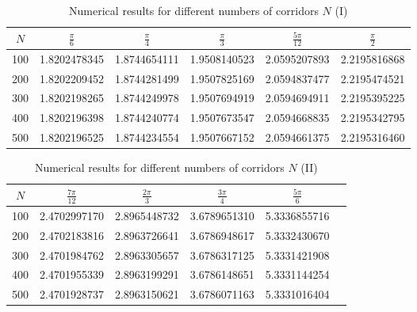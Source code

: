 \documentclass[12pt,a4paper]{article}
\theoremstyle{remark} %
\begin{document}
\begin{table}[htbp]
\centering
\small
\caption{Numerical results for different numbers of corridors $N$ (I)}
\begin{tabular}{c ccccc}
\toprule
$N$ 
& $\frac{\pi}{6}$ 
& $\frac{\pi}{4}$ 
& $\frac{\pi}{3}$ 
& $\frac{5\pi}{12}$ 
& $\frac{\pi}{2}$ \\
\midrule
100 
& 1.8202478345 
& 1.8744654111 
& 1.9508140523 
& 2.0595207893 
& 2.2195816868 \\

200 
& 1.8202209452 
& 1.8744281499 
& 1.9507825169 
& 2.0594837477 
& 2.2195474521 \\

300 
& 1.8202198265 
& 1.8744249978 
& 1.9507694919 
& 2.0594694911 
& 2.2195395225 \\

400 
& 1.8202196398 
& 1.8744240774 
& 1.9507673547 
& 2.0594668835 
& 2.2195342795 \\

500 
& 1.8202196525 
& 1.8744234554 
& 1.9507667152 
& 2.0594661375 
& 2.2195316460 \\
\bottomrule
\end{tabular}
\end{table}

\begin{table}[htbp]
\centering
\small
\caption{Numerical results for different numbers of corridors $N$ (II)}
\begin{tabular}{c ccccc}
\toprule
$N$ 
& $\frac{7\pi}{12}$ 
& $\frac{2\pi}{3}$ 
& $\frac{3\pi}{4}$ 
& $\frac{5\pi}{6}$ \\
\midrule
100 
& 2.4702997170 
& 2.8965448732 
& 3.6789651310 
& 5.3336855716 \\

200 
& 2.4702183816 
& 2.8963726641 
& 3.6786948617 
& 5.3332430670 \\

300 
& 2.4701984762 
& 2.8963305657 
& 3.6786317125 
& 5.3331421908 \\

400 
& 2.4701955339 
& 2.8963199291 
& 3.6786148651 
& 5.3331144254 \\

500 
& 2.4701928737 
& 2.8963150621 
& 3.6786071163 
& 5.3331016404 \\
\bottomrule
\end{tabular}
\end{table}
\end{document}
